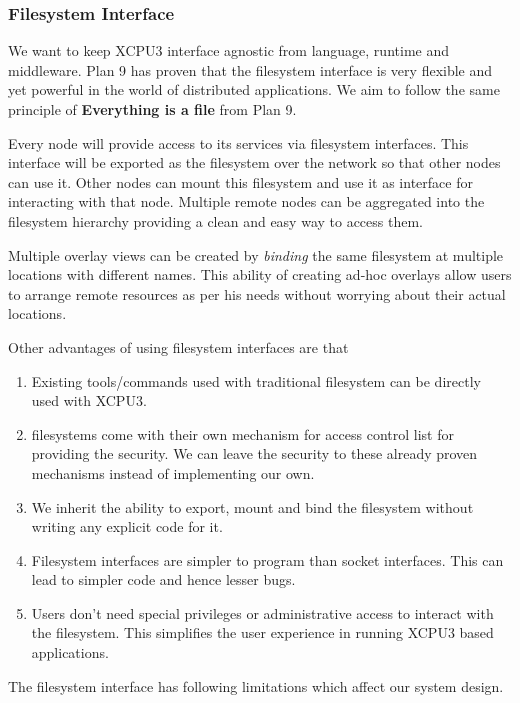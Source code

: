 \documentclass[conference]{IEEEtran}
\begin{document}
\subsubsection{Filesystem Interface}
We want to keep XCPU3 interface agnostic from language, runtime and middleware.
Plan 9 has proven that the filesystem interface is very flexible and yet
powerful in the world of distributed applications.  We aim to follow the same
principle of \textbf{Everything is a file} from Plan 9.

Every node will provide access to its services via filesystem interfaces.
This interface will be exported as the filesystem over the network so that other
nodes can use it. Other nodes can mount this filesystem and use it as
interface for interacting with that node.  Multiple remote nodes can be
aggregated into the filesystem hierarchy providing a clean and easy way to
access them.

Multiple overlay views can be created by \textit{binding} the same filesystem
at multiple locations with different names.  This ability of creating ad-hoc
overlays allow users to arrange remote resources as per his needs without
worrying about their actual locations.

Other advantages of using filesystem interfaces are that 
\begin{enumerate}
\item Existing tools/commands used with traditional filesystem can be directly
used with XCPU3.

\item filesystems come with their own mechanism for access control list for
providing the security.  We can leave the security to these already proven 
mechanisms instead of implementing our own.

\item We inherit the ability to export, mount and bind the filesystem
without writing any explicit code for it.

\item Filesystem interfaces are simpler to program than socket interfaces.  This
can lead to simpler code and hence lesser bugs.

\item Users don't need special privileges or administrative access to interact
with the filesystem.  This simplifies the user experience in running XCPU3 based
applications.
\end{enumerate}

The filesystem interface has following limitations which affect our system
design.
\end{document}
